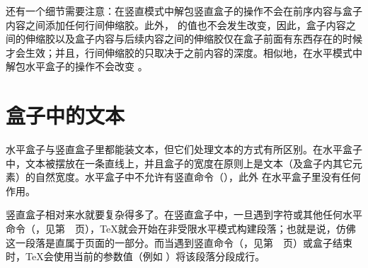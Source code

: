 \documentclass{book}
\begin{document}
还有一个细节需要注意：在竖直模式中解包竖直盒子的操作不会在前序内容与盒子内容之间添加任何行间伸缩胶。此外， 的值也不会发生改变，因此，盒子内容之间的伸缩胶以及盒子内容与后续内容之间的伸缩胶仅在盒子前面有东西存在的时候才会生效；并且，行间伸缩胶的只取决于之前内容的深度。相似地，在水平模式中解包水平盒子的操作不会改变 。

\section{盒子中的文本}

水平盒子与竖直盒子里都能装文本，但它们处理文本的方式有所区别。在水平盒子中，文本被摆放在一条直线上，并且盒子的宽度在原则上是文本（及盒子内其它元素）的自然宽度。水平盒子中不允许有竖直命令（），此外  在水平盒子里没有任何作用。

竖直盒子相对来水就要复杂得多了。在竖直盒子中，一旦遇到字符或其他任何水平命令（，见第~\pageref{h:com:list}~页），\TeX 就会开始在非受限水平模式构建段落；也就是说，仿佛这一段落是直属于页面的一部分。而当遇到竖直命令（，见第~\pageref{v:com:list}~页）或盒子结束时，\TeX 会使用当前的参数值（例如 ）将该段落分段成行。
\end{document}
